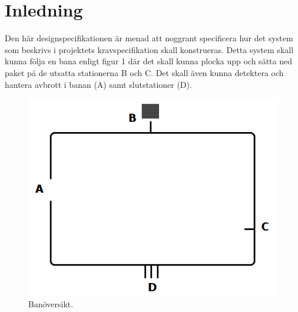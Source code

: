 \section{Inledning}
Den här designspecifikationen är menad att noggrant specificera hur det system som beskrivs i projektets kravspecifikation skall konstrueras. Detta system skall kunna följa en bana enligt figur 1 där det skall kunna plocka upp och sätta ned paket på de utsatta stationerna B och C. Det skall även kunna detektera och hantera avbrott i banan (A) samt slutstationer (D). 

\begin{figure}[h]
\center
\includegraphics[scale=0.4]{figur}
\caption{Banöversikt.} \label{systemskiss:banoversikt}
\end{figure}